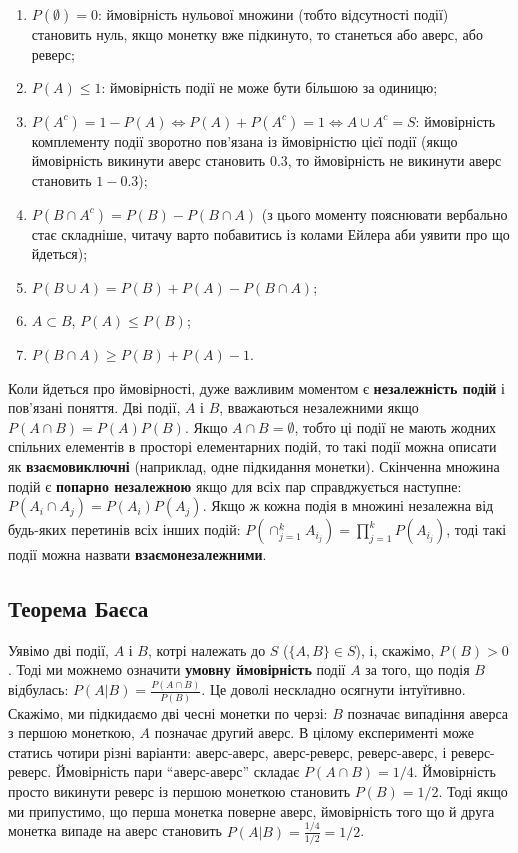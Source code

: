 \documentclass[
  11pt,
]{book}
\providecommand{\tightlist}{%
  \setlength{\itemsep}{0pt}\setlength{\parskip}{0pt}}
\begin{document}
\begin{enumerate}
\def\labelenumi{\arabic{enumi}.}
\tightlist
\item
  \(P(\emptyset) = 0\): ймовірність нульової множини (тобто відсутності події) становить нуль, якщо монетку вже підкинуто, то станеться або аверс, або реверс;
\item
  \(P(A) \leq 1\): ймовірність події не може бути більшою за одиницю;
\item
  \(P(A^c) = 1 - P(A) \Leftrightarrow P(A) + P(A^c) = 1 \Leftrightarrow A \cup A^c = S\): ймовірність комплементу події зворотно пов'язана із ймовірністю цієї події (якщо ймовірність викинути аверс становить \(0.3\), то ймовірність не викинути аверс становить \(1-0.3\));
\item
  \(P(B \cap A^c) = P(B) - P(B\cap A)\) (з цього моменту пояснювати вербально стає складніше, читачу варто побавитись із колами Ейлера аби уявити про що йдеться);
\item
  \(P(B \cup A) = P(B) + P(A) - P(B\cap A)\);
\item
  \(A \subset B\), \(P(A) \leq P(B)\);
\item
  \(P(B \cap A) \geq P(B) + P(A) - 1\).
\end{enumerate}

Коли йдеться про ймовірності, дуже важливим моментом є \textbf{незалежність подій} і пов'язані поняття. Дві події, \(A\) і \(B\), вважаються незалежними якщо \(P(A \cap B) = P(A) P(B)\). Якщо \(A \cap B = \emptyset\), тобто ці події не мають жодних спільних елементів в просторі елементарних подій, то такі події можна описати як \textbf{взаємовиключні} (наприклад, одне підкидання монетки). Скінченна множина подій є \textbf{попарно незалежною} якщо для всіх пар справджується наступне: \(P(A_i \cap A_j) = P(A_i)P(A_j)\). Якщо ж кожна подія в множині незалежна від будь-яких перетинів всіх інших подій: \(P(\cap_{j=1}^k A_{i_j}) = \prod_{j=1}^k P(A_{i_j})\), тоді такі події можна назвати \textbf{взаємонезалежними}.

\subsection{Теорема Баєса}\label{ux442ux435ux43eux440ux435ux43cux430-ux431ux430ux454ux441ux430}

Уявімо дві події, \(A\) і \(B\), котрі належать до \(S\) (\(\{A, B\} \in S\)), і, скажімо, \(P(B) > 0\). Тоді ми можнемо означити \textbf{умовну ймовірність} події \(A\) за того, що подія \(B\) відбулась: \(P(A|B) = \frac{P(A \cap B)}{P(B)}\). Це доволі нескладно осягнути інтуїтивно. Скажімо, ми підкидаємо дві чесні монетки по черзі: \(B\) позначає випадіння аверса з першою монеткою, \(A\) позначає другий аверс. В цілому експерименті може статись чотири різні варіанти: аверс-аверс, аверс-реверс, реверс-аверс, і реверс-реверс. Ймовірність пари ``аверс-аверс'' складає \(P(A \cap B) = 1/4\). Ймовірність просто викинути реверс із першою монеткою становить \(P(B) = 1/2\). Тоді якщо ми припустимо, що перша монетка поверне аверс, ймовірність того що й друга монетка випаде на аверс становить \(P(A | B) = \frac{1/4}{1/2} = 1/2\).
\end{document}
